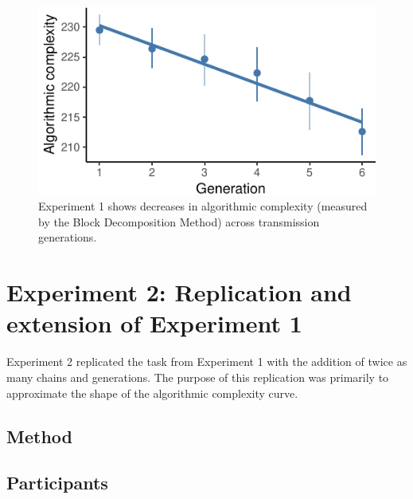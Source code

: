 \documentclass[10pt, letterpaper]{article}
\newenvironment{CodeChunk}{}{}
\begin{document}
\begin{CodeChunk}
\begin{figure}[tb]

{\centering \includegraphics{figs/e1_bdm_plot-1} 

}

\caption[Experiment 1 shows decreases in algorithmic complexity (measured by the Block Decomposition Method) across transmission generations]{Experiment 1 shows decreases in algorithmic complexity (measured by the Block Decomposition Method) across transmission generations.}\label{fig:e1_bdm_plot}
\end{figure}
\end{CodeChunk}

\hypertarget{experiment-2-replication-and-extension-of-experiment-1}{%
\section{Experiment 2: Replication and extension of Experiment
1}\label{experiment-2-replication-and-extension-of-experiment-1}}

Experiment 2 replicated the task from Experiment 1 with the addition of
twice as many chains and generations. The purpose of this replication
was primarily to approximate the shape of the algorithmic complexity
curve.

\hypertarget{method-1}{%
\subsection{Method}\label{method-1}}

\hypertarget{participants-1}{%
\subsection{Participants}\label{participants-1}}
\end{document}

